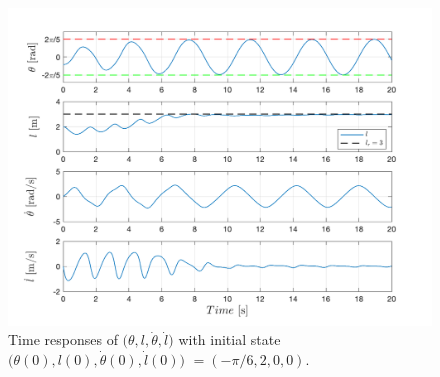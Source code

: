 \documentclass[main.tex]{subfiles}
\begin{document}
\begin{figure}[H]
    \centering
    \includegraphics[scale = 0.6]{figures/Total_Energy_Shaping/total_2b.pdf}
    \caption{Time responses of $\big(\theta,l,\dot{\theta},\dot{l}\big)$ with initial state $\big(\theta(0),l(0),\dot{\theta}(0),\dot{l}(0)\big)$ $= (-\pi/6,2,0,0)$.}
    \label{fig:total_2}
\end{figure}
\end{document}
